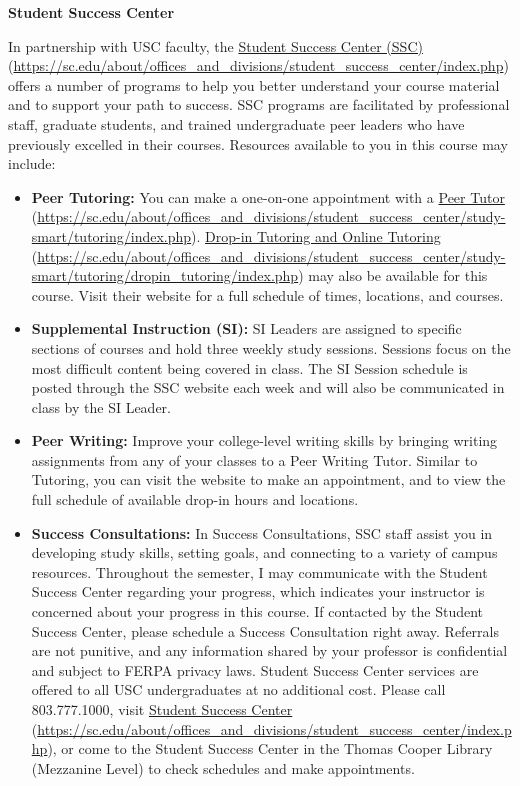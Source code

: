 \documentclass[11pt,letterpaper]{article}
\begin{document}
{\bfseries Student Success Center} \par
In partnership with USC faculty, the \href{https://sc.edu/about/offices\_and\_divisions/student\_success\_center/index.php}{Student Success Center (SSC)} (\url{https://sc.edu/about/offices\_and\_divisions/student\_success\_center/index.php}) offers a number of programs to help you better understand your course material and to support your path to success. SSC programs are facilitated by professional staff, graduate students, and trained undergraduate peer leaders who have previously excelled in their courses. Resources available to you in this course may include:
	\begin{itemize}
	\item {\bfseries Peer Tutoring:} You can make a one-on-one appointment with a \href{https://sc.edu/about/offices\_and\_divisions/student\_success\_center/study-smart/tutoring/index.php}{Peer Tutor} (\url{https://sc.edu/about/offices\_and\_divisions/student\_success\_center/study-smart/tutoring/index.php}). 
	\href{https://sc.edu/about/offices\_and\_divisions/student\_success\_center/study-smart/tutoring/dropin\_tutoring/index.php}{Drop-in Tutoring and Online Tutoring} (\url{https://sc.edu/about/offices\_and\_divisions/student\_success\_center/study-smart/tutoring/dropin\_tutoring/index.php}) may also be available for this course. Visit their website for a full schedule of times, locations, and courses.
	\item {\bfseries Supplemental Instruction (SI):} SI Leaders are assigned to specific sections of courses and hold three weekly study sessions. Sessions focus on the most difficult content being covered in class. The SI Session schedule is posted through the SSC website each week and will also be communicated in class by the SI Leader.
	\item {\bfseries Peer Writing:} Improve your college-level writing skills by bringing writing assignments from any of your classes to a Peer Writing Tutor. Similar to Tutoring, you can visit the website to make an appointment, and to view the full schedule of available drop-in hours and locations.
	\item {\bfseries Success Consultations:} In Success Consultations, SSC staff assist you in developing study skills, setting goals, and connecting to a variety of campus resources. Throughout the semester, I may communicate with the Student Success Center regarding your progress, which indicates your instructor is concerned about your progress in this course. If contacted by the Student Success Center, please schedule a Success Consultation right away. Referrals are not punitive, and any information shared by your professor is confidential and subject to FERPA privacy laws. Student Success Center services are offered to all USC undergraduates at no additional cost. Please call 803.777.1000, visit \href{https://sc.edu/about/offices\_and\_divisions/student\_success\_center/index.php}{Student Success Center} (\url{https://sc.edu/about/offices\_and\_divisions/student\_success\_center/index.php}), or come to the Student Success Center in the Thomas Cooper Library (Mezzanine Level) to check schedules and make appointments.
	\end{itemize} \pvspace{0.1cm}
	
\end{document}
